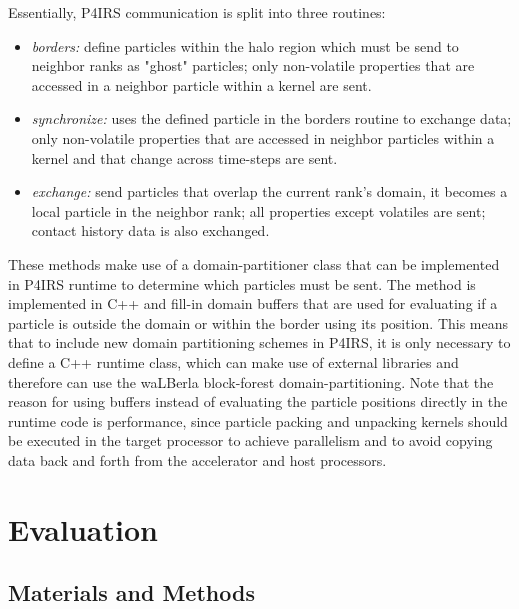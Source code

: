 \documentclass[preprint,12pt]{elsarticle}
\begin{document}
Essentially, P4IRS communication is split into three routines:

\begin{itemize}
    \item \emph{borders:} define particles within the halo region which must be send to neighbor ranks as "ghost" particles; only non-volatile properties that are accessed in a neighbor particle within a kernel are sent.
    \item \emph{synchronize:} uses the defined particle in the borders routine to exchange data; only non-volatile properties that are accessed in neighbor particles within a kernel and that change across time-steps are sent.
    \item \emph{exchange:} send particles that overlap the current rank's domain, it becomes a local particle in the neighbor rank; all properties except volatiles are sent; contact history data is also exchanged.
\end{itemize}

These methods make use of a domain-partitioner class that can be implemented in P4IRS runtime to determine which particles must be sent.
The method is implemented in C++ and fill-in domain buffers that are used for evaluating if a particle is outside the domain or within the border using its position.
This means that to include new domain partitioning schemes in P4IRS, it is only necessary to define a C++ runtime class, which can make use of external libraries and therefore can use the waLBerla block-forest domain-partitioning.
Note that the reason for using buffers instead of evaluating the particle positions directly in the runtime code is performance, since particle packing and unpacking kernels should be executed in the target processor to achieve parallelism and to avoid copying data back and forth from the accelerator and host processors.

\section{Evaluation}
\label{sec:evaluation}


\subsection{Materials and Methods}
\end{document}
